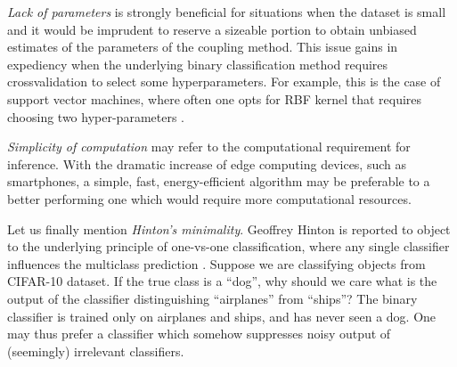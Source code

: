 \emph{Lack of parameters} is strongly beneficial for situations when the dataset is small and it would be imprudent to reserve a sizeable portion to obtain unbiased estimates of the parameters of the coupling method. 
This issue gains in expediency when the underlying binary classification method requires crossvalidation to select some hyperparameters. For example, this is the case of support vector machines, where often one opts for RBF kernel that requires choosing two hyper-parameters \cite{wu2004probability}. 

\emph{Simplicity of computation}  may refer to the computational requirement for inference. With the dramatic increase of edge computing devices, such as smartphones, a simple, fast, energy-efficient algorithm may be preferable to a better performing one which would require more computational resources. 

Let us finally mention \emph{Hinton's minimality}. Geoffrey Hinton is reported to object to the underlying principle of one-vs-one classification, where any single classifier influences the multiclass prediction \cite[p.~467]{hastie1998classification}. Suppose we are classifying objects from CIFAR-10 dataset.  If the true class is  a ``dog'', why should we care what is the output of the classifier distinguishing ``airplanes'' from ``ships''? The binary classifier is trained only on airplanes and ships, and has never seen a dog. One may thus prefer a classifier which somehow suppresses noisy output of (seemingly) irrelevant classifiers.



